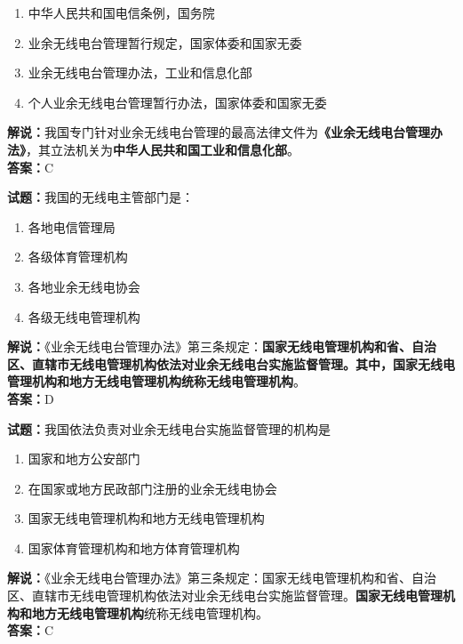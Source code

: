 \documentclass{ctexbook}
\begin{document}
\begin{enumerate}[leftmargin=3em]
	\item 中华人民共和国电信条例，国务院
	\item 业余无线电台管理暂行规定，国家体委和国家无委
	\item 业余无线电台管理办法，工业和信息化部
	\item 个人业余无线电台管理暂行办法，国家体委和国家无委
\end{enumerate}

\noindent\textbf{解说：}我国专门针对业余无线电台管理的最高法律文件为\textbf{《业余无线电台管理办法》}，其立法机关为\textbf{中华人民共和国工业和信息化部}。\\\noindent\textbf{答案：}C

\bigskip


\noindent\textbf{试题：}我国的无线电主管部门是：

\begin{enumerate}[leftmargin=3em]
	\item 各地电信管理局
	\item 各级体育管理机构
	\item 各地业余无线电协会
	\item 各级无线电管理机构
\end{enumerate}
\noindent\textbf{解说：}《业余无线电台管理办法》第三条规定：\textbf{国家无线电管理机构和省、自治区、直辖市无线电管理机构依法对业余无线电台实施监督管理。其中，国家无线电管理机构和地方无线电管理机构统称无线电管理机构}。\\\noindent\textbf{答案：}D

\bigskip


\noindent\textbf{试题：}我国依法负责对业余无线电台实施监督管理的机构是

\begin{enumerate}[leftmargin=3em]
	\item 国家和地方公安部门
	\item 在国家或地方民政部门注册的业余无线电协会
	\item 国家无线电管理机构和地方无线电管理机构
	\item 国家体育管理机构和地方体育管理机构
\end{enumerate}

\noindent\textbf{解说：}《业余无线电台管理办法》第三条规定：国家无线电管理机构和省、自治区、直辖市无线电管理机构依法对业余无线电台实施监督管理。\textbf{国家无线电管理机构和地方无线电管理机构}统称无线电管理机构。\\\noindent\textbf{答案：}C
\end{document}
